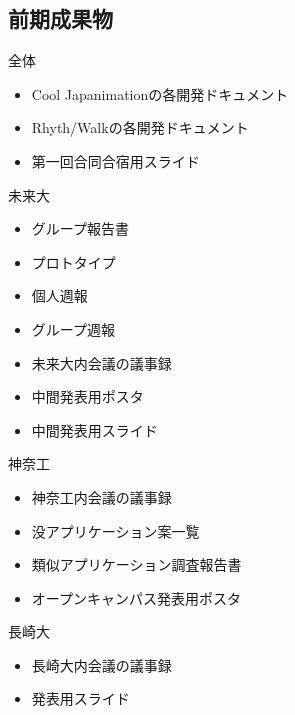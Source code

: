 \subsection{前期成果物}

全体
\begin{itemize}
\item Cool Japanimationの各開発ドキュメント
\item Rhyth/Walkの各開発ドキュメント
\item 第一回合同合宿用スライド
\end{itemize}

未来大
\begin{itemize}
\item グループ報告書
\item プロトタイプ
\item 個人週報
\item グループ週報
\item 未来大内会議の議事録
\item 中間発表用ポスタ
\item 中間発表用スライド
\end{itemize}

神奈工
\begin{itemize}
\item 神奈工内会議の議事録
\item 没アプリケーション案一覧
\item 類似アプリケーション調査報告書
\item オープンキャンパス発表用ポスタ
\end{itemize}

長崎大
\begin{itemize}
\item 長崎大内会議の議事録
\item 発表用スライド
\end{itemize}
